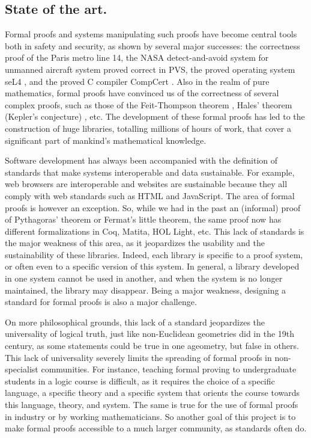 \subsection{State of the art.}

Formal proofs and systems manipulating such proofs have become
central tools both in safety and security, as shown by several major
successes: the correctness proof of the Paris metro line 14, the NASA
detect-and-avoid system for unmanned aircraft system proved correct in
PVS, the proved operating system seL4 \cite{Klein09}, and the proved C
compiler CompCert \cite{Leroy06}.  Also in the realm of pure mathematics,
formal proofs have convinced us of the
correctness of several complex proofs, such as those of the Feit-Thompson
theorem \cite{Gonthier13}, Hales' theorem (Kepler's conjecture)
\cite{Hales17}, etc.  The development of these formal proofs has led
to the construction of huge libraries, totalling millions of hours of
work, that cover a significant part of mankind's mathematical knowledge.

Software development has always been accompanied with the definition
of standards that make systems interoperable and data sustainable. For
example, web browsers are interoperable and websites are sustainable
because they all comply with web standards such as HTML and
JavaScript. The area of formal proofs is however an exception. So,
while we had in the past an (informal) proof of Pythagoras' theorem or
Fermat's little theorem, the same proof now has different
formalizations in {\sc Coq}, {\sc Matita}, {\sc HOL Light}, etc. This
lack of standards is the major weakness of this area, as it
jeopardizes the usability and the sustainability of these
libraries. Indeed, each library is specific to a proof
system, or often even to a specific version of this system. In
general, a library developed in one system cannot be used in another,
and when the system is no longer maintained, the library may
disappear. Being a major weakness, designing a standard for formal
proofs is also a major challenge.

On more philosophical grounds, this lack of a standard jeopardizes the
universality of logical truth, just like non-Euclidean geometries
did in the 19th century, as some statements could be true in one
ageometry, but false in others.  This lack of universality severely
limits the spreading of formal proofs in non-specialist
communities. For instance, teaching formal proving to undergraduate
students in a logic course is difficult, as it
requires the choice of a specific language, a specific theory and a specific system that
orients the course towards this language, theory, and
system. The same is true for the use of formal proofs in
industry or by working mathematicians. So another goal of this project
is to make formal proofs accessible to a much larger community, as
standards often do.

